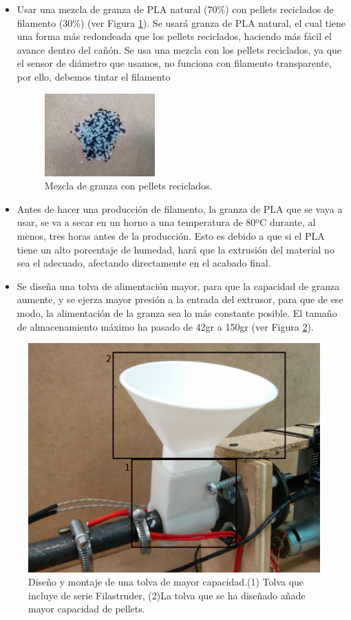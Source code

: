 \begin{itemize}
    \item{Usar una mezcla de granza de PLA natural (70\%) con pellets reciclados de filamento (30\%) (ver Figura \ref{fig:2007105-mezc}). Se usará granza de PLA natural, el cual tiene una forma más redondeada que los pellets reciclados, haciendo más fácil el avance dentro del cañón. Se usa una mezcla con los pellets reciclados, ya que el sensor de diámetro que usamos, no funciona con filamento transparente, por ello, debemos tintar el filamento}
	    \begin{figure}[H]
		    \centering
		    \includegraphics[width=0.4\textwidth]{images/producciones/20072015/IMG_20150903_155859.jpg}
		    \caption{Mezcla de granza con pellets reciclados.}
		    \label{fig:2007105-mezc}
		\end{figure}
    \item{Antes de hacer una producción de filamento, la granza de PLA que se vaya a usar, se va a secar en un horno a una temperatura de 80ºC durante, al menos, tres horas antes de la producción. Esto es debido a que si el PLA tiene un alto porcentaje de humedad, hará que la extrusión del material no sea el adecuado, afectando directamente en el acabado final.}
    \item{Se diseña una tolva de alimentación mayor, para que la capacidad de granza aumente, y se ejerza mayor presión a la entrada del extrusor, para que de ese modo, la alimentación de la granza sea lo más constante posible. El tamaño de almacenamiento máximo ha pasado de 42gr a 150gr (ver Figura \ref{fig:tolv_montaj}).}
\end{itemize}

\begin{figure}[H]
    \centering
        \includegraphics[width=0.5\linewidth]{images/producciones/20072015/IMG_20150721_121904.jpg}
        \caption[Diseño y montaje de una tolva de mayor capacidad.]{Diseño y montaje de una tolva de mayor capacidad.(1) Tolva que incluye de serie Filastruder, (2)La tolva que se ha diseñado añade mayor capacidad de pellets.}
        \label{fig:tolv_montaj}
\end{figure}

